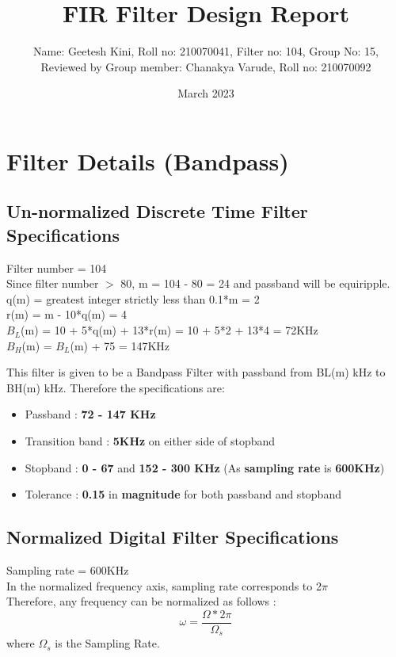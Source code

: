 \documentclass{article}
\title{FIR Filter Design Report}
\author{Name: Geetesh Kini, Roll no: 210070041, Filter no: 104, Group No: 15,\\ Reviewed by Group member: Chanakya Varude, Roll no: 210070092}
\date{March 2023}
\begin{document}
\maketitle

\tableofcontents
\clearpage

\section{Filter Details (Bandpass)}

\subsection{Un-normalized Discrete Time Filter Specifications}

Filter number = 104\\
Since filter number $>$ 80, m = 104 - 80 = 24 and passband will be equiripple.\\
q(m) = greatest integer strictly less than 0.1*m = 2\\
r(m) = m - 10*q(m) = 4\\
$B_L$(m) = 10 + 5*q(m) + 13*r(m) = 10 + 5*2 + 13*4 = 72KHz \\
$B_H$(m) = $B_L$(m) + 75 = 147KHz\\

\vspace{1.5em}
\noindent

This filter is given to be a Bandpass Filter with passband from BL(m) kHz to BH(m) kHz.
Therefore the specifications are:
\begin{itemize}
    \item Passband : \textbf{72 - 147 KHz}
    \item  Transition band : \textbf{5KHz} on either side of stopband
    \item Stopband : \textbf{0 - 67} and \textbf{152 - 300 KHz} (As \textbf{sampling rate} is \textbf{600KHz})

    \item  Tolerance : \textbf{0.15} in \textbf{magnitude} for both passband and stopband
\end{itemize}

\subsection{Normalized Digital Filter Specifications}
Sampling rate = 600KHz\\
In the normalized frequency axis, sampling rate corresponds to 2$\pi$\\
Therefore, any frequency can be normalized as follows :
\begin{equation*}
    \omega = \frac{\Omega*2\pi}{\Omega_s}
\end{equation*}
where $\Omega_s$ is the Sampling Rate.\\
\end{document}
